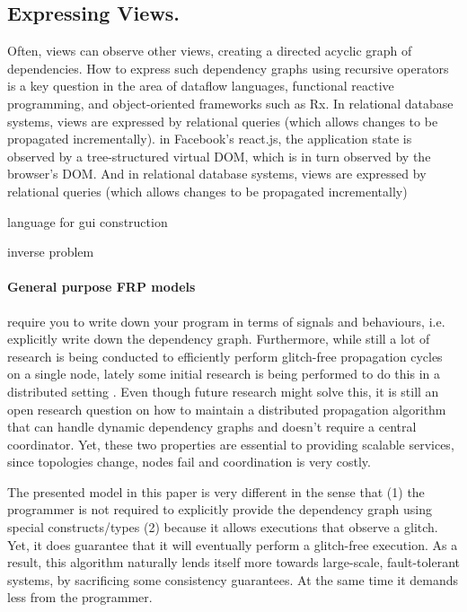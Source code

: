 \subsection{Expressing Views.} Often, views can observe other views, creating a directed acyclic graph of dependencies. How to express such dependency graphs using recursive operators is a key question in the area of dataflow languages, functional reactive programming, and object-oriented frameworks such as Rx. In relational database systems, views are expressed by relational queries (which allows changes to be propagated incrementally). in Facebook's react.js, the application state is observed by a tree-structured virtual DOM, which is in turn observed by the browser's DOM. And in relational database systems, views are expressed by relational queries (which allows changes to be propagated incrementally)

 


 
 
\cite{burckhardt-leijen-yi-sadowski-ball-OOPSLA11}
\cite{camil}


\cite{alive}
\cite{react}

\cite{elm} language for gui construction

\cite{statelines} inverse problem



\paragraph{General purpose FRP models} \cite{reactivesurvey} require you to write down your program in terms of signals and behaviours, i.e. explicitly write down the dependency graph. Furthermore, while still a lot of research is being conducted to efficiently perform glitch-free propagation cycles on a single node, lately some initial research is being performed to do this in a distributed setting \cite{elm}\cite{drescala}. Even though future research might solve this, it is still an open research question on how to maintain a distributed propagation algorithm that can handle dynamic dependency graphs and doesn't require a central coordinator. Yet, these two properties are essential to providing scalable services, since topologies change, nodes fail and coordination is very costly.

The presented model in this paper is very different in the sense that (1) the programmer is not required to explicitly provide the dependency graph using special constructs/types (2) because it allows executions that observe a glitch. Yet, it does guarantee that it will eventually perform a glitch-free execution. As a result, this algorithm naturally lends itself more towards large-scale, fault-tolerant systems, by sacrificing some consistency guarantees. At the same time it demands less from the programmer. \newline


